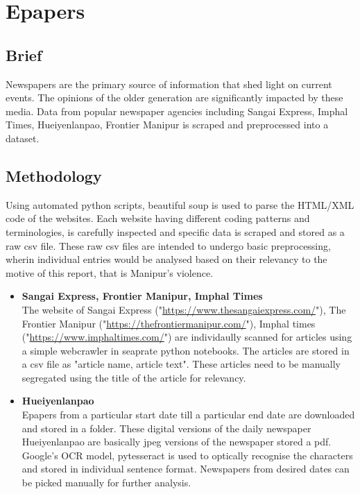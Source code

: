 \documentclass{report}
\begin{document}
\newpage
\vspace*{3pt}
\section{Epapers}
\subsection{Brief}
Newspapers are the primary source of information that shed light on current events. The opinions of the older generation are significantly impacted by these media. Data from popular newspaper agencies including Sangai Express, Imphal Times, Hueiyenlanpao, Frontier Manipur is scraped and preprocessed into a dataset.
\subsection{Methodology}
Using automated python scripts, beautiful soup is used to parse the HTML/XML code of the websites. Each website having different coding patterns and terminologies, is carefully inspected and specific data is scraped and stored as a raw csv file. These raw csv files are intended to undergo basic preprocessing, wherin individual entries would be analysed based on their relevancy to the motive of this report, that is Manipur's violence.
\begin{itemize}
    \item \textbf{Sangai Express, Frontier Manipur, Imphal Times}
    \\The website of Sangai Express ("\url{https://www.thesangaiexpress.com/}"), The Frontier Manipur ("\url{https://thefrontiermanipur.com/}"), Imphal times ("\url{https://www.imphaltimes.com/}") are individaully scanned for articles using a simple webcrawler in seaprate python notebooks. The articles are stored in a csv file as "article name, article text". These articles need to be manually segregated using the title of the article for relevancy.
    \item \textbf{Hueiyenlanpao}
    \\Epapers from a particular start date till a particular end date are downloaded and stored in a folder. These digital versions of the daily newspaper Hueiyenlanpao are basically jpeg versions of the newspaper stored a pdf. Google's OCR model, pytesseract is used to optically recognise the characters and stored in individual sentence format. Newspapers from desired dates can be picked manually for further analysis.
\end{itemize}
\end{document}
